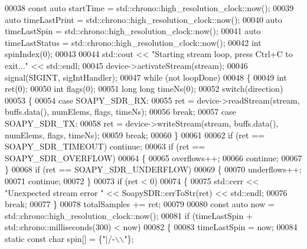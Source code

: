 \begin{DoxyCode}
00038     \textcolor{keyword}{const} \textcolor{keyword}{auto} startTime = std::chrono::high\_resolution\_clock::now();
00039     \textcolor{keyword}{auto} timeLastPrint = std::chrono::high\_resolution\_clock::now();
00040     \textcolor{keyword}{auto} timeLastSpin = std::chrono::high\_resolution\_clock::now();
00041     \textcolor{keyword}{auto} timeLastStatus = std::chrono::high\_resolution\_clock::now();
00042     \textcolor{keywordtype}{int} spinIndex(0);
00043 
00044     std::cout << \textcolor{stringliteral}{"Starting stream loop, press Ctrl+C to exit..."} << std::endl;
00045     device->activateStream(stream);
00046     signal(SIGINT, sigIntHandler);
00047     \textcolor{keywordflow}{while} (not loopDone)
00048     \{
00049         \textcolor{keywordtype}{int} ret(0);
00050         \textcolor{keywordtype}{int} flags(0);
00051         \textcolor{keywordtype}{long} \textcolor{keywordtype}{long} timeNs(0);
00052         \textcolor{keywordflow}{switch}(direction)
00053         \{
00054         \textcolor{keywordflow}{case} SOAPY_SDR_RX:
00055             ret = device->readStream(stream, buffs.data(), numElems, flags, timeNs);
00056             \textcolor{keywordflow}{break};
00057         \textcolor{keywordflow}{case} SOAPY_SDR_TX:
00058             ret = device->writeStream(stream, buffs.data(), numElems, flags, timeNs);
00059             \textcolor{keywordflow}{break};
00060         \}
00061 
00062         \textcolor{keywordflow}{if} (ret == SOAPY_SDR_TIMEOUT) \textcolor{keywordflow}{continue};
00063         \textcolor{keywordflow}{if} (ret == SOAPY_SDR_OVERFLOW)
00064         \{
00065             overflows++;
00066             \textcolor{keywordflow}{continue};
00067         \}
00068         \textcolor{keywordflow}{if} (ret == SOAPY_SDR_UNDERFLOW)
00069         \{
00070             underflows++;
00071             \textcolor{keywordflow}{continue};
00072         \}
00073         \textcolor{keywordflow}{if} (ret < 0)
00074         \{
00075             std::cerr << \textcolor{stringliteral}{"Unexpected stream error "} << SoapySDR::errToStr(ret) << std::endl;
00076             \textcolor{keywordflow}{break};
00077         \}
00078         totalSamples += ret;
00079 
00080         \textcolor{keyword}{const} \textcolor{keyword}{auto} now = std::chrono::high\_resolution\_clock::now();
00081         \textcolor{keywordflow}{if} (timeLastSpin + std::chrono::milliseconds(300) < now)
00082         \{
00083             timeLastSpin = now;
00084             \textcolor{keyword}{static} \textcolor{keyword}{const} \textcolor{keywordtype}{char} spin[] = \{\textcolor{stringliteral}{"|/-\(\backslash\)\(\backslash\)"}\};

\end{DoxyCode}
